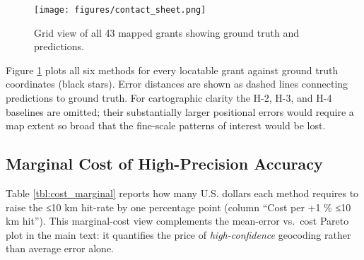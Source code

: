\begin{figure}
\centering
\texttt{[image: figures/contact\_sheet.png]}
\caption{Grid view of all 43 mapped grants showing ground truth and
predictions.}\label{fig:contactsheet}
\end{figure}

Figure \ref{fig:contactsheet} plots all six methods for every locatable
grant against ground truth coordinates (black stars). Error distances
are shown as dashed lines connecting predictions to ground truth. For
cartographic clarity the H-2, H-3, and H-4 baselines are omitted; their
substantially larger positional errors would require a map extent so
broad that the fine-scale patterns of interest would be lost.

\subsection{Marginal Cost of High-Precision
Accuracy}\label{c.3-marginal-cost-of-high-precision-accuracy}

Table \ref{tbl:cost_marginal} reports how many U.S. dollars each method
requires to raise the ≤10 km hit-rate by one percentage point (column
``Cost per +1 \% ≤10 km hit''). This marginal-cost view complements the
mean-error vs.~cost Pareto plot in the main text: it quantifies the
price of \emph{high-confidence} geocoding rather than average error
alone.

